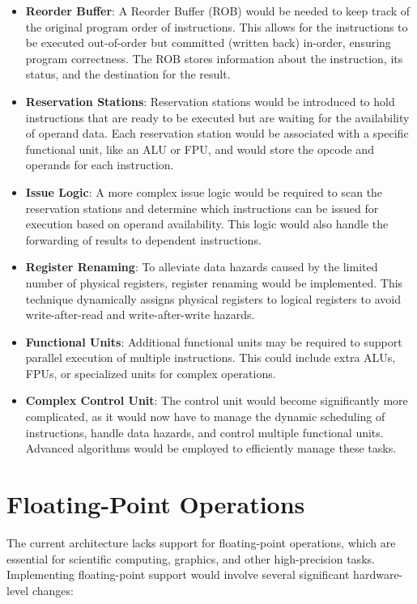 \begin{itemize}
    \item \textbf{Reorder Buffer}: A Reorder Buffer (ROB) would be needed to keep track of the original program order of instructions. This allows for the instructions to be executed out-of-order but committed (written back) in-order, ensuring program correctness. The ROB stores information about the instruction, its status, and the destination for the result.
    
    \item \textbf{Reservation Stations}: Reservation stations would be introduced to hold instructions that are ready to be executed but are waiting for the availability of operand data. Each reservation station would be associated with a specific functional unit, like an ALU or FPU, and would store the opcode and operands for each instruction.
    
    \item \textbf{Issue Logic}: A more complex issue logic would be required to scan the reservation stations and determine which instructions can be issued for execution based on operand availability. This logic would also handle the forwarding of results to dependent instructions.
    
    \item \textbf{Register Renaming}: To alleviate data hazards caused by the limited number of physical registers, register renaming would be implemented. This technique dynamically assigns physical registers to logical registers to avoid write-after-read and write-after-write hazards.
    
    \item \textbf{Functional Units}: Additional functional units may be required to support parallel execution of multiple instructions. This could include extra ALUs, FPUs, or specialized units for complex operations.
    
    \item \textbf{Complex Control Unit}: The control unit would become significantly more complicated, as it would now have to manage the dynamic scheduling of instructions, handle data hazards, and control multiple functional units. Advanced algorithms would be employed to efficiently manage these tasks.
\end{itemize}

\section{Floating-Point Operations}
The current architecture lacks support for floating-point operations, which are essential for scientific computing, graphics, and other high-precision tasks. Implementing floating-point support would involve several significant hardware-level changes:

